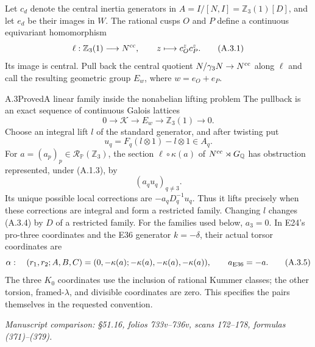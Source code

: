 Let $c_d$ denote the central inertia generators in
$A=I/[N,I]=\mathbb Z_3(1)[D]$, and let $e_d$ be their images in $W$.
The rational cusps $O$ and $P$ define a continuous equivariant
homomorphism
\[
 \ell:\mathbb Z_3(1)\longrightarrow N^{\rm cc},\qquad
 z\longmapsto c_O^zc_P^z.
 \tag{A.3.1}
\]
Its image is central. Pull back the central quotient
$N/\gamma_3N\to N^{\rm cc}$ along $\ell$ and call the resulting
geometric group $E_w$, where $w=e_O+e_P$.

\begin{statement}{A.3}{Proved}{A linear family inside the nonabelian lifting problem}
The pullback is an exact sequence of continuous Galois lattices
\[
 0\longrightarrow\mathcal K\longrightarrow E_w
 \longrightarrow\mathbb Z_3(1)\longrightarrow0.
 \tag{A.3.2}
\]
Choose an integral lift $l$ of the standard generator, and after
twisting put
\[
 u_q=F_q(l\otimes1)-l\otimes1\in A_q.
 \tag{A.3.3}
\]
For $a=(a_p)_p\in\mathcal R_{\mathbb P}(\mathbb Z_3)$, the section
$\ell\circ\kappa(a)$ of $N^{\rm cc}\rtimes G_{\mathbb Q}$ has
obstruction represented, under (A.1.3), by
\[
 (a_qu_q)_{q\ne3}.
 \tag{A.3.4}
\]
Its unique possible local corrections are $-a_qD_q^{-1}u_q$.
Thus it lifts precisely when these corrections are integral and
form a restricted family. Changing $l$ changes (A.3.4) by $D$ of
a restricted family.
For the families used below, $a_3=0$. In E24's pro-three coordinates
and the E36 generator $k=-\delta$, their actual torsor coordinates
are
\[
 \alpha:\quad(r_1,r_2;A,B,C)=(0,-\kappa(a);
                  -\kappa(a),-\kappa(a),-\kappa(a)),
 \qquad a_{\rm E36}=-a.
 \tag{A.3.5}
\]
The three $K_0$ coordinates use the inclusion of rational Kummer
classes; the other torsion, framed-$\lambda$, and divisible
coordinates are zero. This specifies the pairs themselves in the
requested convention.
\par\smallskip\noindent\emph{Manuscript comparison: \S51.16,
folios 733v--736v, scans 172--178, formulas (371)--(379).}
\end{statement}
